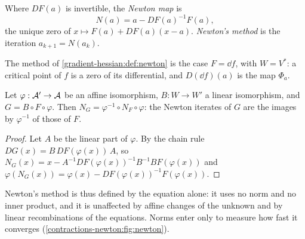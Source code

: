 \begin{notechapter}
\begin{definition}\label{contractions-newton:def:newton}
Where $DF(a)$ is invertible, the \emph{Newton map} is
\[
  N(a) = a - DF(a)^{-1}F(a) ,
\]
the unique zero of $x\mapsto F(a) + DF(a)(x - a)$. \emph{Newton's method}
is the iteration $a_{k+1} = N(a_k)$.
\end{definition}

The method of \cref{gradient-hessian:def:newton} is the case
$F = \dd f$, with $W = V^*$: a critical point of $f$ is a zero of its
differential, and $D(\dd f)(a)$ is the map $\Phi_a$.

\begin{proposition}[Invariance]\label{contractions-newton:prop:invariance}
Let $\varphi:\mathcal{A}'\to\mathcal{A}$ be an affine isomorphism, $B:W\to W'$ a linear
isomorphism, and $G = B\circ F\circ\varphi$. Then
$N_G = \varphi^{-1}\circ N_F\circ\varphi$: the Newton iterates of $G$ are
the images by $\varphi^{-1}$ of those of $F$.
\end{proposition}

\begin{proof}
Let $A$ be the linear part of $\varphi$. By the chain rule
$DG(x) = B\,DF(\varphi(x))\,A$, so
$N_G(x) = x - A^{-1}DF(\varphi(x))^{-1}B^{-1}BF(\varphi(x))$ and
$\varphi(N_G(x)) = \varphi(x) - DF(\varphi(x))^{-1}F(\varphi(x))$.
\end{proof}

Newton's method is thus defined by the equation alone: it uses no norm
and no inner product, and it is unaffected by affine changes of the
unknown and by linear recombinations of the equations. Norms enter only
to measure how fast it converges (\cref{contractions-newton:fig:newton}).


\end{notechapter}
